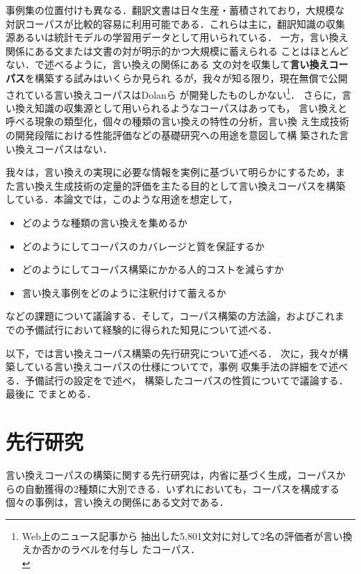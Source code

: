 事例集の位置付けも異なる．翻訳文書は日々生産・蓄積されており，大規模な
対訳コーパスが比較的容易に利用可能である．これらは主に，翻訳知識の収集
源あるいは統計モデルの学習用データとして用いられている．
一方，言い換え関係にある文または文書の対が明示的かつ大規模に蓄えられる
ことはほとんどない．で述べるように，言い換えの関係にある
文の対を収集して\textbf{言い換えコーパス}を構築する試みはいくらか見られ
るが，我々が知る限り，現在無償で公開されている言い換えコーパスはDolanら
\cite{dolan:05}が開発したものしかない\footnote{Web上のニュース記事から
  抽出した5,801文対に対して2名の評価者が言い換えか否かのラベルを付与し
  たコーパス．
\\}．
さらに，言い換え知識の収集源として用いられるようなコーパスはあっても，
言い換えと呼べる現象の類型化，個々の種類の言い換えの特性の分析，言い換
え生成技術の開発段階における性能評価などの基礎研究への用途を意図して構
築された言い換えコーパスはない．

我々は，言い換えの実現に必要な情報を実例に基づいて明らかにするため，ま
た言い換え生成技術の定量的評価を主たる目的として言い換えコーパスを構築
している．本論文では，このような用途を想定して，
\begin{itemize}
\item どのような種類の言い換えを集めるか
\item どのようにしてコーパスのカバレージと質を保証するか
\item どのようにしてコーパス構築にかかる人的コストを減らすか
\item 言い換え事例をどのように注釈付けて蓄えるか
\end{itemize}
などの課題について議論する．そして，コーパス構築の方法論，およびこれま
での予備試行において経験的に得られた知見について述べる．

以下，では言い換えコーパス構築の先行研究について述べる．
次に，我々が構築している言い換えコーパスの仕様についてで，事例
収集手法の詳細をで述べる．予備試行の設定をで述べ，
構築したコーパスの性質についてで議論する．最後に
でまとめる．

\section{先行研究}
\label{sec:previous}

言い換えコーパスの構築に関する先行研究は，内省に基づく生成，コーパスか
らの自動獲得の2種類に大別できる．いずれにおいても，コーパスを構成する
個々の事例は，言い換えの関係にある文対である．

